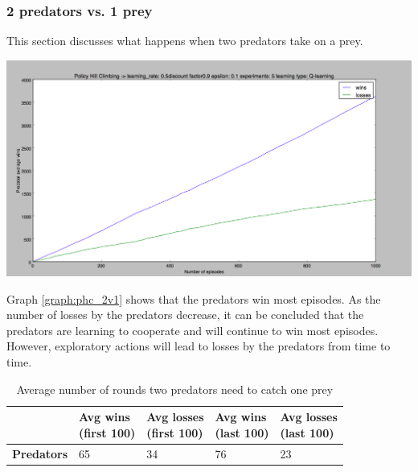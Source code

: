 \subsubsection{2 predators vs. 1 prey}
This section discusses what happens when two predators take on a prey.

\begin{center}
	\includegraphics[scale=0.3]{hillclimbing1000times5step01}
	\label{graph:phc_2v1}
\end{center}

Graph \ref{graph:phc_2v1} shows that the predators win most episodes. As the number of losses by the predators decrease, it can be concluded that the predators are learning to cooperate and will continue to win most episodes. However, exploratory actions will lead to losses by the predators from time to time.

\begin{table}[H]
\begin{center}
\begin{tabular}{| l | l | l | l | l |}
\hline
 & \parbox{2cm}{\textbf{Avg wins \\ (first 100)}} & \parbox{2cm}{\textbf{Avg losses \\ (first 100)}} & \parbox{2cm}{\textbf{Avg wins \\ (last 100)}} & \parbox{2cm}{\textbf{Avg losses \\ (last 100)}} \\
\hline
\textbf{Predators} & 65 & 34 & 76 & 23 \\
\hline
\end{tabular}
\caption{Average number of rounds two predators need to catch one prey}
\label{table:phc_2vs1}
\end{center}
\end{table}

